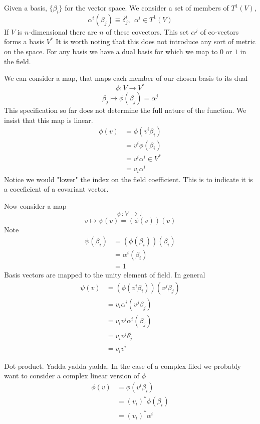 \documentclass[a4paper]{scrartcl}
\begin{document}
Given a basis, $\{\beta_{i}\}$ for the vector space. We consider a set of members of $T^{1}(V)$,
$$\alpha^{i}(\beta_{j}) \equiv \delta^{i}_{j}, \ \ \alpha^{i}\in T^{1}(V)$$
If $V$ is $n$-dimensional there are $n$ of these covectors. This set $\alpha^{j}$ of co-vectors forms a basis $V^{\ast}$
It is worth noting that this does not introduce any sort of metric on the space. For any basis we have a dual basis for which we map to $0$ or $1$ in the field.

We can consider a map, that maps each member of our chosen basis to its dual
$$\phi\colon V \rightarrow V^{\ast}$$
$$\beta_{j} \mapsto \phi(\beta_{j}) = \alpha^{j}$$
This specification so far does not determine the full nature of the function. We insist that this map is linear.
\begin{align*}
\phi(v) &= \phi(v^{i} \beta_{i})   \\
& = v^{i} \phi(\beta_{i}) \\
& = v^{i} \alpha^{i} \in V^{\ast} \\
& = v_{i} \alpha^{i}
\end{align*}
Notice we would "lower" the index on the field coefficient. This is to indicate it is a coeeficient of a covariant vector.


Now consider a map 
$$\psi\colon V \rightarrow \mathbb{F}$$
$$v \mapsto \psi(v) = (\phi(v))(v)$$
Note
\begin{align*}
\psi(\beta_{i}) &= (\phi(\beta_{i}))(\beta_{i})   \\
&= \alpha^{i}(\beta_{i}) \\
&= 1
\end{align*}
Basis vectors are mapped to the unity element of field. In general
\begin{align*}
\psi(v) &= (\phi(v^{i} \beta_{i}))(v^{j} \beta_{j}) \\
&= v_{i} \alpha^{i} (v^{j} \beta_{j})    \\
&= v_{i}v^{j} \alpha^{i} (\beta_{j}) \\
&= v_{i}v^{j} \delta^{i}_{j} \\
&= v_{i}v^{i}
\end{align*}

Dot product. Yadda yadda yadda.
In the case of a complex filed we probably want to consider a complex linear version of $\phi$
\begin{align*}
\phi(v) &= \phi(v^{i} \beta_{i})   \\
&= (v_{i})^{\ast} \phi(\beta_{i}) \\
&= (v_{i})^{\ast} \alpha^{i} \\
\end{align*}
\end{document}
